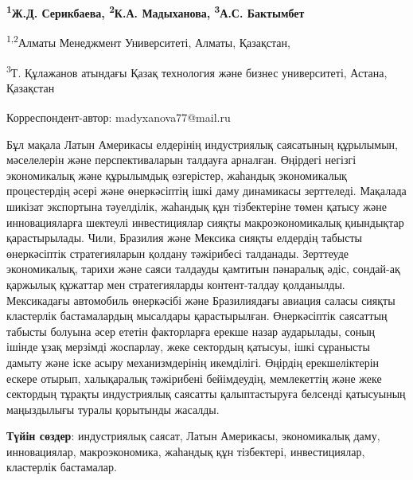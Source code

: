 
\begin{articleheader}

{\bfseries
\textsuperscript{1}Ж.Д. Серикбаева,
\textsuperscript{2}К.А. Мадыханова\textsuperscript{\envelope },
\textsuperscript{3}А.С. Бактымбет
}
\end{articleheader}

\begin{affiliation}
\textsuperscript{1,2}Алматы Менеджмент Университеті, Алматы, Қазақстан,

\textsuperscript{3}Т. Құлажанов атындағы Қазақ технология және бизнес университеті, Астана, Қазақстан

\raggedright \textsuperscript{\envelope }Корреспондент-автор: madyxanova77@mail.ru
\end{affiliation}

Бұл мақала Латын Америкасы елдерінің индустриялық саясатының құрылымын,
мәселелерін және перспективаларын талдауға арналған. Өңірдегі негізгі
экономикалық және құрылымдық өзгерістер, жаһандық экономикалық
процестердің әсері және өнеркәсіптің ішкі даму динамикасы зерттеледі.
Мақалада шикізат экспортына тәуелділік, жаһандық құн тізбектеріне төмен
қатысу және инновацияларға шектеулі инвестициялар сияқты
макроэкономикалық қиындықтар қарастырылады. Чили, Бразилия және Мексика
сияқты елдердің табысты өнеркәсіптік стратегияларын қолдану тәжірибесі
талданады. Зерттеуде экономикалық, тарихи және саяси талдауды қамтитын
пәнаралық әдіс, сондай-ақ қаржылық құжаттар мен стратегияларды
контент-талдау қолданылды. Мексикадағы автомобиль өнеркәсібі және
Бразилиядағы авиация саласы сияқты кластерлік бастамалардың мысалдары
қарастырылған. Өнеркәсіптік саясаттың табысты болуына әсер ететін
факторларға ерекше назар аударылады, соның ішінде ұзақ мерзімді
жоспарлау, жеке сектордың қатысуы, ішкі сұранысты дамыту және іске асыру
механизмдерінің икемділігі. Өңірдің ерекшеліктерін ескере отырып,
халықаралық тәжірибені бейімдеудің, мемлекеттің және жеке сектордың
тұрақты индустриялық саясатты қалыптастыруға белсенді қатысуының
маңыздылығы туралы қорытынды жасалды.

{\bfseries Түйін сөздер}: индустриялық саясат, Латын Америкасы,
экономикалық даму, инновациялар, макроэкономика, жаһандық құн
тізбектері, инвестициялар, кластерлік бастамалар.

